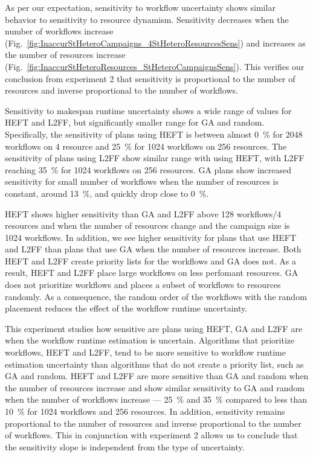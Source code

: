 As per our expectation, sensitivity to workflow uncertainty shows similar behavior to sensitivity to resource dynamism.
Sensitivity decreases when the number of workflows increase (Fig.~\ref{fig:InaccurStHeteroCampaigns_4StHeteroResourcesSens}) and increases as the number of resources increase (Fig.~\ref{fig:InaccurStHeteroResources_StHeteroCampaignsSens}).
This verifies our conclusion from experiment 2 that sensitivity is proportional to the number of resources and inverse proportional to the number of workflows.

Sensitivity to makespan runtime uncertainty shows a wide range of values for HEFT and L2FF, but significantly smaller range for GA and random.
Specifically, the sensitivity of plans using HEFT is between almost 0~\% for 2048 workflows on 4 resource and 25~\% for 1024 workflows on 256 resources.
The sensitivity of plans using L2FF show similar range with using HEFT, with L2FF reaching 35~\% for 1024 workflows on 256 resources.
GA plans show increased sensitivity for small number of workflows when the number of resources is constant, around 13~\%, and quickly drop close to 0~\%.

HEFT shows higher sensitivity than GA and L2FF above 128 workflows/4 resources and when the number of resources change and the campaign size is 1024 workflows.
In addition, we see higher sensitivity for plans that use HEFT and L2FF than plans that use GA when the number of resources increase.
Both HEFT and L2FF create priority lists for the workflows and GA does not.
As a result, HEFT and L2FF place large workflows on less perfomant resources.
GA does not prioritize workflows and places a subset of workflows to resources randomly.
As a consequence, the random order of the workflows with the random placement reduces the effect of the workflow runtime uncertainty.

This experiment studies how sensitive are plans using HEFT, GA and L2FF are when the workflow runtime estimation is uncertain.
Algorithms that prioritize workflows, HEFT and L2FF, tend to be more sensitive to workflow runtime estimation uncertainty than algorithms that do not create a priority list, such as GA and random.
HEFT and L2FF are more sensitive than GA and random when the number of resources increase and show similar sensitivity to GA and random when the number of workflows increase --- 25~\% and 35~\% compared to less than 10~\% for 1024 workflows and 256 resources.
In addition, sensitivity remains proportional to the number of resources and inverse proportional to the number of workflows.
This in conjunction with experiment 2 allows us to conclude that the sensitivity slope is independent from the type of uncertainty.

